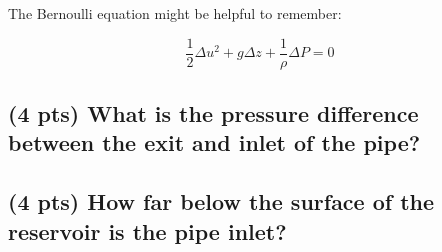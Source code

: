 \documentclass[11pt]{article}
\begin{document}
\noindent The Bernoulli equation might be helpful to remember:

\[\frac{1}{2}\Delta u^{2}+g \Delta z + \frac{1}{\rho}\Delta P = 0 \]

\subsection{(4 pts) What is the pressure difference between the exit and inlet of the pipe?}
\label{sec-2-1}
\vspace{10cm}
\subsection{(4 pts) How far below the surface of the reservoir is the pipe inlet?}
\label{sec-2-2}
\end{document}

